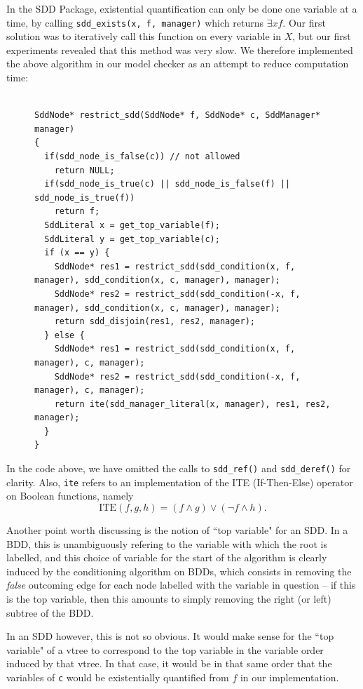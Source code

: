 \documentclass[11pt]{report}
\begin{document}
In the SDD Package, existential quantification can only be done one variable at a time, by calling \texttt{sdd\_exists(x, f, manager)} which returns $\exists x f$. Our first solution was to iteratively call this function on every variable in $X$, but our first experiments revealed that this method was very slow. We therefore implemented the above algorithm in our model checker as an attempt to reduce computation time:
\begin{figure}

\begin{lstlisting}[mathescape]

SddNode* restrict_sdd(SddNode* f, SddNode* c, SddManager* manager) 
{
  if(sdd_node_is_false(c)) // not allowed
    return NULL; 
  if(sdd_node_is_true(c) || sdd_node_is_false(f) || sdd_node_is_true(f))
    return f;
  SddLiteral x = get_top_variable(f);
  SddLiteral y = get_top_variable(c);
  if (x == y) {
    SddNode* res1 = restrict_sdd(sdd_condition(x, f, manager), sdd_condition(x, c, manager), manager);
    SddNode* res2 = restrict_sdd(sdd_condition(-x, f, manager), sdd_condition(x, c, manager), manager);
    return sdd_disjoin(res1, res2, manager);
  } else {
    SddNode* res1 = restrict_sdd(sdd_condition(x, f, manager), c, manager);
    SddNode* res2 = restrict_sdd(sdd_condition(-x, f, manager), c, manager);
    return ite(sdd_manager_literal(x, manager), res1, res2, manager);
  }
}

\end{lstlisting}
\caption*{}
\end{figure}
In the code above, we have omitted the calls to \texttt{sdd\_ref()} and \texttt{sdd\_deref()} for clarity. Also, \texttt{ite} refers to an implementation of the ITE (If-Then-Else) operator on Boolean functions, namely $$\mbox{ITE}(f, g, h) = (f \land g) \lor (\lnot f \land h).$$

Another point worth discussing is the notion of ``top variable" for an SDD. In a BDD, this is unambiguously refering to the variable with which the root is labelled, and this choice of variable for the start of the algorithm is clearly induced by the conditioning algorithm on BDDs, which consists in removing the \textit{false} outcoming edge for each node labelled with the variable in question -- if this is the top variable, then this amounts to simply removing the right (or left) subtree of the BDD. 

In an SDD however, this is not so obvious. It would make sense for the ``top variable" of a vtree to correspond to the top variable in the variable order induced by that vtree. In that case, it would be in that same order that the variables of \texttt{c} would be existentially quantified from $f$ in our implementation.
\end{document}

